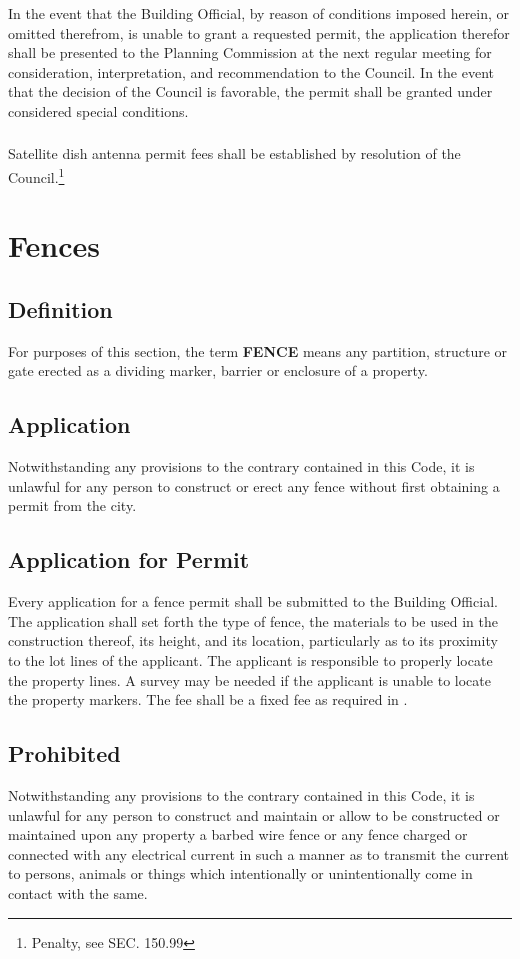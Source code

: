 \subsubsection{}
In the event that the Building Official, by reason of conditions imposed herein, or omitted therefrom, is unable to grant a requested permit, the application therefor shall be presented to the Planning Commission at the next regular meeting for consideration, interpretation, and recommendation to the Council.  In the event that the decision of the Council is favorable, the permit shall be granted under considered special conditions.
\subsubsection{}
Satellite dish antenna permit fees shall be established by resolution of the Council.\footnote{Penalty, see SEC. 150.99}

\section{Fences}
\subsection{Definition}
For purposes of this section, the term \textbf{FENCE} means any partition, structure or gate erected as a dividing marker, barrier or enclosure of a property.
\subsection{Application}
Notwithstanding any provisions to the contrary contained in this Code, it is unlawful for any person to construct or erect any fence without first obtaining a permit from the city.
\subsection{Application for Permit}
Every application for a fence permit shall be submitted to the Building Official.  The application shall set forth the type of fence, the materials to be used in the construction thereof, its height, and its location, particularly as to its proximity to the lot lines of the applicant.  The applicant is responsible to properly locate the property lines.  A survey may be needed if the applicant is unable to locate the property markers.  The fee shall be a fixed fee as required in .
\subsection{Prohibited}
Notwithstanding any provisions to the contrary contained in this Code, it is unlawful for any person to construct and maintain or allow to be constructed or maintained upon any property a barbed wire fence or any fence charged or connected with any electrical current in such a manner as to transmit the current to persons, animals or things which intentionally or unintentionally come in contact with the same.
